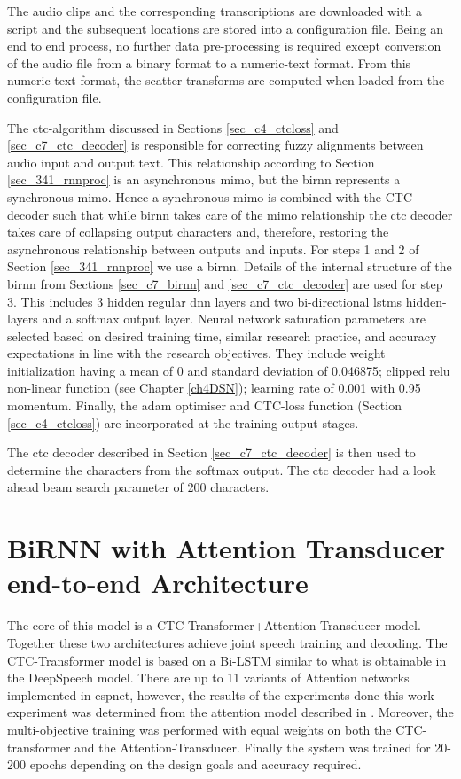The audio clips and the corresponding transcriptions are downloaded with a script and the subsequent locations are stored into a configuration file. Being an end to end process, no further data pre-processing is required except conversion of the audio file from a binary format to a numeric-text format.  From this numeric text format, the scatter-transforms are computed when loaded from the configuration file.  

The \acrshort{ctc}-algorithm discussed in Sections \ref{sec_c4_ctcloss} and \ref{sec_c7_ctc_decoder} is responsible for correcting fuzzy alignments between audio input and output text.  This relationship according to Section \ref{sec_341_rnnproc} is an asynchronous \acrshort{mimo}, but the \acrshort{birnn} represents a synchronous \acrshort{mimo}. Hence a synchronous \acrshort{mimo} is combined with the CTC-decoder such that while \acrshort{birnn} takes care of the \acrlong{mimo} relationship the \acrshort{ctc} decoder takes care of collapsing output characters and, therefore, restoring the asynchronous relationship between outputs and inputs.  For steps 1 and 2 of Section \ref{sec_341_rnnproc} we use a \acrshort{birnn}.  Details of the internal structure of the \acrshort{birnn} from Sections \ref{sec_c7_birnn} and \ref{sec_c7_ctc_decoder} are used for step 3.  This includes 3 hidden regular \acrshort{dnn} layers and two bi-directional \acrshort{lstm}s hidden-layers and a softmax output layer.  Neural network saturation parameters are selected based on desired training time, similar research practice, and accuracy expectations in line with the research objectives. They include weight initialization having a mean of 0 and standard deviation of 0.046875; clipped \acrshort{relu} non-linear function (see Chapter \ref{ch4DSN}); learning rate of 0.001 with 0.95 momentum.  Finally, the adam optimiser and CTC-loss function (Section \ref{sec_c4_ctcloss}) are incorporated at the training output stages.

The \acrshort{ctc} decoder described in Section \ref{sec_c7_ctc_decoder} is then used to determine the characters from the softmax output.  The \acrshort{ctc} decoder had a look ahead beam search parameter of 200 characters.

\section{BiRNN with Attention Transducer end-to-end Architecture}\label{sec_7_5_blstm_t}

The core of this model is a CTC-Transformer+Attention Transducer model.  Together these two architectures achieve joint speech training and decoding.  The CTC-Transformer model is based on a Bi-LSTM similar to what is obtainable in the DeepSpeech model. There are up to 11 variants of Attention networks implemented in \acrshort{espnet}, however, the results of the experiments done this work experiment was determined from the attention model described in \cite{chorowski2015attention}.  Moreover, the multi-objective training was performed with equal weights on both the CTC-transformer and the Attention-Transducer.  Finally the system was trained for 20-200 epochs depending on the design goals and accuracy required.


